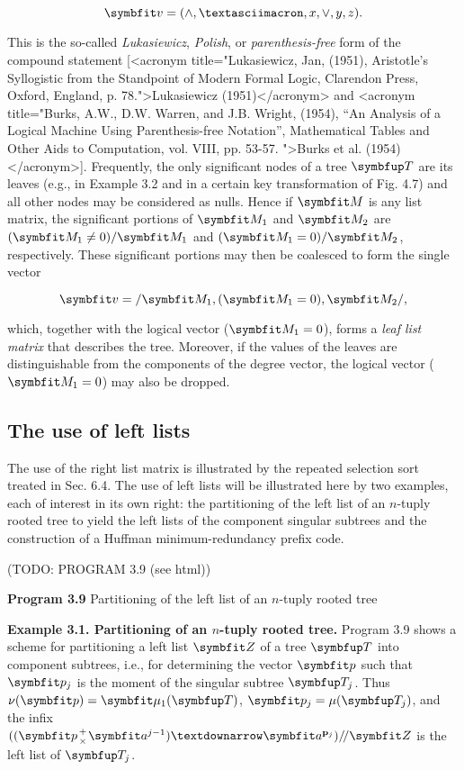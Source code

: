 $$
  \vect{v} = (\wedge, ¯, x, \vee, y, z).
$$

\par This is the so-called \textit{Lukasiewicz}, \textit{Polish}, or \textit{parenthesis-free} form of the compound statement [<acronym title="Lukasiewicz, Jan, (1951), Aristotle’s Syllogistic from the Standpoint of Modern Formal Logic, Clarendon Press, Oxford, England, p. 78.">Lukasiewicz (1951)</acronym> and <acronym title="Burks, A.W., D.W. Warren, and J.B. Wright, (1954), “An Analysis of a Logical Machine Using Parenthesis-free Notation”, Mathematical Tables and Other Aids to Computation, vol. VIII, pp. 53-57. ">Burks et al. (1954)</acronym>]. Frequently, the only significant nodes of a tree $\tree{T}$ are its leaves (e.g., in Example 3.2 and in a certain key transformation of Fig. 4.7) and all other nodes may be considered as nulls. Hence if $\mat{M}$ is any list matrix, the significant portions of $\mat{M}_1$ and $\mat{M}_2$ are $(\mat{M}_1 \neq 0)/\mat{M}_1$ and $(\mat{M}_1 = 0)/\mat{M}_2$, respectively. These significant portions may then be coalesced to form the single vector

$$
  \vect{v} = /\mat{M}_1, (\mat{M}_1 = 0), \mat{M}_2/,
$$

\noindent which, together with the logical vector ($\mat{M}_1 = 0$), forms a \textit{leaf list matrix} that describes the tree. Moreover, if the values of the leaves are distinguishable from the components of the degree vector, the logical vector ($\mat{M}_1 = 0$) may also be dropped.

\subsection*{The use of left lists}

\par The use of the right list matrix is illustrated by the repeated selection sort treated in Sec. 6.4. The use of left lists will be illustrated here by two examples, each of interest in its own right: the partitioning of the left list of an $n$-tuply rooted tree to yield the left lists of the component singular subtrees and the construction of a Huffman minimum-redundancy prefix code.

\par (TODO: PROGRAM 3.9 (see html))

\par \textbf{Program 3.9} Partitioning of the left list of an $n$-tuply rooted tree

\par \textbf{Example 3.1. Partitioning of an $n$-tuply rooted tree.} Program 3.9 shows a scheme for partitioning a left list $\mat{Z}$ of a tree $\tree{T}$ into component subtrees, i.e., for determining the vector $\vect{p}$ such that $\vect{p}_j$ is the moment of the singular subtree $\tree{T}_j$. Thus $\nu(\vect{p}) = \vect{\mu}_1(\tree{T})$, $\vect{p}_j = \mu(\tree{T}_j)$, and the infix $((\vect{p} {+ \atop \times} \vect{a}^{j-1}) ↓ \vect{a}^{\mathbf{ p}_j})/\!/\mat{Z}$ is the left list of $\tree{T}_j$.

